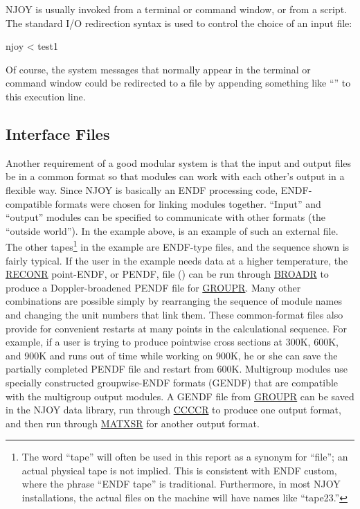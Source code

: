 NJOY is usually invoked from a terminal or command window, or from a
script.  The standard I/O redirection syntax is used to control the
choice of an input file:

\small
\begin{ccode}

   njoy < test1

\end{ccode}
\normalsize

\noindent
Of course, the system messages that normally appear in the terminal
or command window could be redirected to a file by appending
something like ``'' to this execution line.

\subsection{Interface Files}
\label{ssNJOY_interface}

Another requirement of a good modular system is that the input and
output files be in a common format so that modules can work with each
other's output in a flexible way.  Since NJOY is basically an ENDF
processing code, ENDF-compatible formats were chosen for linking
modules together.  ``Input'' and ``output'' modules can be specified
to communicate with other formats (the ``outside world'').  In the
example above,  is an example of such an external file.
The other tapes\footnote{The word ``tape'' will often be used in
this report as a synonym for ``file''; an actual physical tape is
not implied.  This is consistent with ENDF custom, where the phrase
``ENDF tape'' is traditional.  Furthermore, in most NJOY installations,
the actual files on the machine will have names like ``tape23.''} in the
example are ENDF-type files, and the sequence shown is fairly typical.
If the user in the example needs data at a higher temperature, the
\hyperlink{sRECONRhy}{RECONR} point-ENDF,
or PENDF, file () can be run through
\hyperlink{sBROADRhy}{BROADR} to produce
a Doppler-broadened PENDF file for
\hyperlink{sGROUPRhy}{GROUPR}.  Many other
combinations are possible simply by rearranging the sequence of module
names and changing the unit numbers that link them.  These
common-format files also provide for convenient restarts
at many points in the calculational sequence.  For example, if a user
is trying to produce pointwise cross sections at 300K, 600K, and 900K
and runs out of time while working on 900K, he or she can save the
partially completed PENDF file and restart from 600K.  Multigroup
modules use specially constructed groupwise-ENDF formats
(GENDF) that are compatible with the multigroup output
modules.  A GENDF file from \hyperlink{sGROUPRhy}{GROUPR}
can be saved in the NJOY data library, run through
\hyperlink{sCCCCRhy}{CCCCR} to produce one output format,
and then run through \hyperlink{sMATXSRhy}{MATXSR} 
for another output format.

